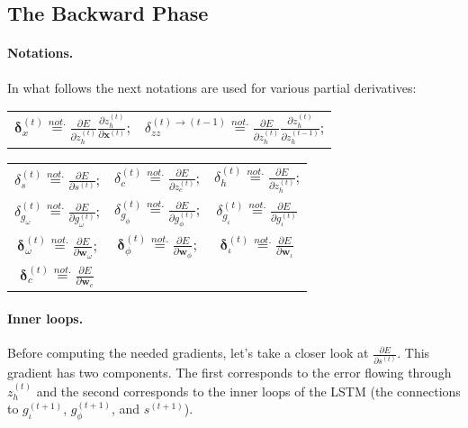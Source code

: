 \documentclass[11pt]{article}
\begin{document}
\subsection{The Backward Phase}

\paragraph{Notations.} In what follows the next notations are used for various partial derivatives:

\begin{center}
\begin{tabular}{c c}
    $\boldsymbol{\delta}_{x}^{(t)} \overset{not.}{=} \displaystyle\frac{\partial E}{\partial z_h^{(t)}}\displaystyle\frac{\partial z_h^{(t)}} {\partial \mathbf{x}^{(t)}}$; &
    $\delta_{zz}^{(t)\rightarrow(t-1)} \overset{not.}{=} \displaystyle\frac{\partial E}{\partial z_h^{(t)}}\displaystyle\frac{\partial z_h^{(t)}} {\partial z_h^{(t-1)}}$; \\[20pt]
\end{tabular}
\begin{tabular}{c c c}
    $\delta_{s}^{(t)} \overset{not.}{=} \displaystyle\frac{\partial E}{\partial s^{(t)}}$; &
    $\delta_{c}^{(t)} \overset{not.}{=} \displaystyle\frac{\partial E}{\partial z_c^{(t)}}$; &
    $\delta_{h}^{(t)} \overset{not.}{=} \displaystyle\frac{\partial E}{\partial z_h^{(t)}}$;  \\[20pt]
    $\delta_{g_{\omega}}^{(t)} \overset{not.}{=} \displaystyle\frac{\partial E}{\partial g_{\omega}^{(t)}}$; &
    $\delta_{g_{\phi}}^{(t)} \overset{not.}{=} \displaystyle\frac{\partial E}{\partial g_{\phi}^{(t)}}$; &
    $\delta_{g_{\iota}}^{(t)} \overset{not.}{=} \displaystyle\frac{\partial E}{\partial g_{\iota}^{(t)}}$ \\[20pt]
    $\boldsymbol{\delta}_{\omega}^{(t)} \overset{not.}{=} \displaystyle\frac{\partial E}{\partial \mathbf{w}_{\omega}}$; &
    $\boldsymbol{\delta}_{\phi}^{(t)} \overset{not.}{=} \displaystyle\frac{\partial E}{\partial \mathbf{w}_{\phi}}$; &
    $\boldsymbol{\delta}_{\iota}^{(t)} \overset{not.}{=} \displaystyle\frac{\partial E}{\partial \mathbf{w}_{\iota}}$ \\[20pt]
    $\boldsymbol{\delta}_{c}^{(t)} \overset{not.}{=} \displaystyle\frac{\partial E}{\partial \mathbf{w}_{c}}$
\end{tabular}
\end{center}

\paragraph{Inner loops.} Before computing the needed gradients, let's take a closer look at $\frac{\partial E}{\partial s^{(t)}}$. This gradient has two components. The first corresponds to the error flowing through $z_h^{(t)}$ and the second corresponds to the inner loops of the LSTM (the connections to $g_{\iota}^{(t+1)}$, $g_{\phi}^{(t+1)}$, and $s^{(t+1)}$).
\end{document}
